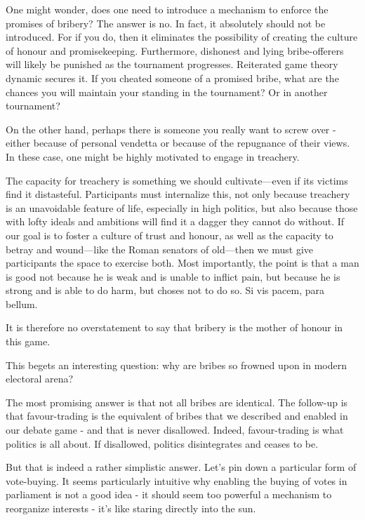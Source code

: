 One might wonder, does one need to introduce a mechanism to enforce the promises of bribery? The answer is no. In fact, it absolutely should not be introduced. For if you do, then it eliminates the possibility of creating the culture of honour and promisekeeping. Furthermore, dishonest and lying bribe-offerers will likely be punished as the tournament progresses. Reiterated game theory dynamic secures it. If you cheated someone of a promised bribe, what are the chances you will maintain your standing in the tournament? Or in another tournament? 

On the other hand, perhaps there is someone you really want to screw over - either because of personal vendetta or because of the repugnance of their views. In these case, one might be highly motivated to engage in treachery.

The capacity for treachery is something we should cultivate—even if its victims find it distasteful. Participants must internalize this, not only because treachery is an unavoidable feature of life, especially in high politics, but also because those with lofty ideals and ambitions will find it a dagger they cannot do without. If our goal is to foster a culture of trust and honour, as well as the capacity to betray and wound—like the Roman senators of old—then we must give participants the space to exercise both. Most importantly, the point is that a man is good not because he is weak and is unable to inflict pain, but because he is strong and is able to do harm, but choses not to do so. Si vis pacem, para bellum.


It is therefore no overstatement to say that bribery is the mother of honour in this game. 


This begets an interesting question: why are bribes so frowned upon in modern electoral arena? 

The most promising answer is that not all bribes are identical. The follow-up is that favour-trading is the equivalent of bribes that we described and enabled in our debate game - and that is never disallowed. Indeed, favour-trading is what politics is all about. If disallowed, politics disintegrates and ceases to be. 


But that is indeed a rather simplistic answer. Let's pin down a particular form of vote-buying. It seems particularly intuitive why enabling the buying of votes in parliament is not a good idea - it should seem too powerful a mechanism to reorganize interests - it's like staring directly into the sun. 

